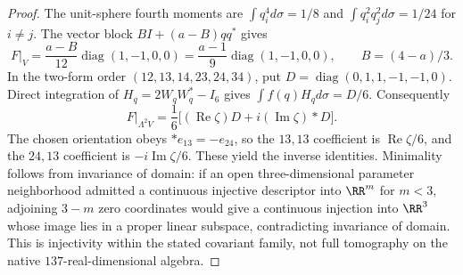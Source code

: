 \documentclass[11pt,a4paper]{article}
\begin{document}
\begin{proof}
The unit-sphere fourth moments are
\(\int q_i^4d\sigma=1/8\) and
\(\int q_i^2q_j^2d\sigma=1/24\) for \(i\ne j\).
The vector block \(BI+(a-B)qq^*\) gives
\[
 F|_V=\frac{a-B}{12}\operatorname{diag}(1,-1,0,0)
 =\frac{a-1}{9}\operatorname{diag}(1,-1,0,0),
 \qquad B=(4-a)/3.
\]
In the two-form order \((12,13,14,23,24,34)\), put
\(D=\operatorname{diag}(0,1,1,-1,-1,0)\). Direct integration of
\(H_q=2W_qW_q^*-I_6\) gives
\(\int f(q)H_qd\sigma=D/6\). Consequently
\[
 F|_{\Lambda^2V}
 =\frac16\bigl[(\operatorname{Re}\zeta)D
                   +i(\operatorname{Im}\zeta)*D\bigr].
\]
The chosen orientation obeys \(*e_{13}=-e_{24}\), so the \(13,13\)
coefficient is \(\operatorname{Re}\zeta/6\), and the \(24,13\)
coefficient is \(-i\operatorname{Im}\zeta/6\). These yield the inverse identities. Minimality follows from invariance
of domain: if an open three-dimensional parameter neighborhood admitted
a continuous injective descriptor into \(\RR^m\) for \(m<3\), adjoining
\(3-m\) zero coordinates would give a continuous injection into
\(\RR^3\) whose image lies in a proper linear subspace, contradicting
invariance of domain. This is injectivity within the stated covariant
family, not full tomography on the native \(137\)-real-dimensional algebra.
\end{proof}
\end{document}

